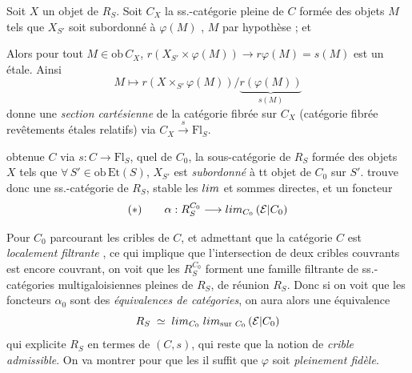 \documentclass[11pt,a4paper]{article}
\begin{document}
Soit $X$ un objet de $R_S$. Soit $C_X$ la ss.-catégorie pleine de $C$ formée
des objets $M$ 
\struck{\ill{}} tels que $X_{S'}$ soit subordonné à $\varphi(M)$ , \ill{} $M$
\struck{\ill{}}  \ill{} par hypothèse ; et \ill{}

Alors pour tout  $M \in \mathrm{ob}\,C_X$,
$r(X_{S'} \times \varphi(M)) \longrightarrow r\varphi(M) = s(M)$ est un
  étale.  Ainsi
\[
  M \longmapsto r(X \times_{S'} \varphi(M)) \big/ \underbrace{r(\varphi(M))}_{s(M)}
\]
donne une \emph{section cartésienne} de la catégorie fibrée sur $C_X$
  (catégorie fibrée
  revêtements étales relatifs) via
$C_X \xrightarrow{\ s\ } \mathrm{Fl}_S$.


 obtenue   $C$ via
$s : C \to \mathrm{Fl}_S$, \struck{\ill{}} \ill{} quel  de
$C_0$,   la sous-catégorie
  de $R_S$ formée des objets $X$
\struck{\ill{}} tels que $\forall\, S' \in \mathrm{ob}\,\mathrm{Et}(S)$,
\struck{\ill{}} $X_{S'}$ est  \emph{subordonné} à tt objet de $C_0$
sur $S'$. \ill{} trouve donc une ss.-catégorie  de
$R_S$, stable \ill{} les $\varprojlim$ et sommes directes, et un foncteur
\[
  (\ast) \qquad \alpha : R_S^{C_0} \longrightarrow
  \varprojlim_{C_0} \, (\mathcal{E}|C_0)
\]



Pour $C_0$ parcourant les cribles   de $C$,
 et admettant que la catégorie  $C$ est
\emph{localement filtrante} \ill{}, ce qui implique que l'intersection de deux
cribles couvrants est encore couvrant, on voit que les $R_S^{C_0}$ forment une
famille filtrante de ss.-catégories multigaloisiennes pleines de $R_S$, de
\ill{} réunion $R_S$. Donc \ill{} si on voit que les foncteurs $\alpha_0$ sont
des \emph{équivalences de catégories}, on aura alors une équivalence
\[
  R_S \;\simeq\; \varinjlim_{C_0} \; \varprojlim_{\text{sur } C_0} \,
  (\mathcal{E}|C_0)
\]
qui explicite $R_S$ en termes de $(C, s)$,   qui reste
 que la notion de \emph{crible admissible}. On va montrer
\ill{} pour que les \struck{\ill{}} \ill{} il suffit que $\varphi$ soit
\emph{pleinement fidèle}.
\end{document}

